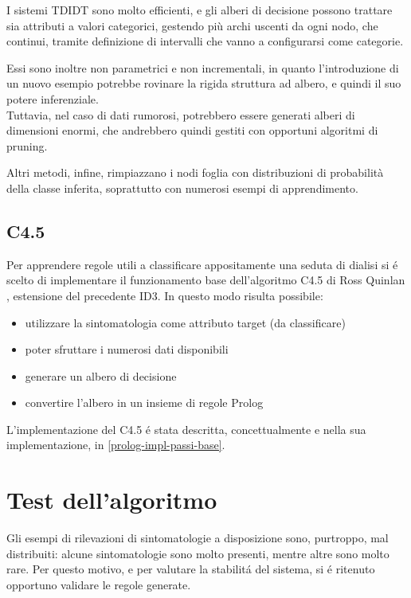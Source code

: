 \documentclass[preprint]{acm_proc_article-sp}
\begin{document}
I sistemi TDIDT sono molto efficienti, e gli alberi di decisione possono trattare sia attributi a valori categorici, gestendo più archi uscenti da ogni nodo, che continui, tramite definizione di intervalli che vanno a configurarsi come categorie.

Essi sono inoltre non parametrici e non incrementali, in quanto l'introduzione di un nuovo esempio potrebbe rovinare la rigida struttura ad albero, e quindi il suo potere inferenziale.\\
Tuttavia, nel caso di dati rumorosi, potrebbero essere generati alberi di dimensioni enormi, che andrebbero quindi gestiti con opportuni algoritmi di pruning.

Altri metodi, infine, rimpiazzano i nodi foglia con distribuzioni di probabilità della classe inferita, soprattutto con numerosi esempi di apprendimento.

\subsection{C4.5}
Per apprendere regole utili a classificare appositamente una seduta di dialisi si \'e scelto di implementare il funzionamento base dell'algoritmo C4.5 di Ross Quinlan \cite{Quinlan:1993:CPM:583200} \cite{Salzberg:1994:BRC:198277.637825}, estensione del precedente ID3\cite{Mitchell:1997:ML:541177}. In questo modo risulta possibile:
\begin{itemize}
\item utilizzare la sintomatologia come attributo target (da classificare)
\item poter sfruttare i numerosi dati disponibili
\item generare un albero di decisione
\item convertire l'albero in un insieme di regole Prolog
\end{itemize}

L'implementazione del C4.5 \'e stata descritta, concettualmente e nella sua implementazione, in \ref{prolog-impl-passi-base}.

\section{Test dell'algoritmo}
Gli esempi di rilevazioni di sintomatologie a disposizione sono, purtroppo, mal distribuiti: alcune sintomatologie sono molto presenti, mentre altre sono molto rare.
Per questo motivo, e per valutare la stabilit\'a del sistema, si \'e ritenuto opportuno validare le regole generate.
\end{document}

